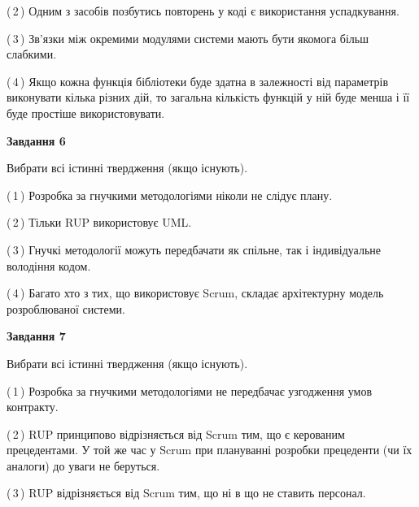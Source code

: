 \documentclass[10pt, ukrainian]{article}
\begin{document}
{\begin {large}
(\,2\,) Одним з засобів позбутись повторень у коді є використання успадкування. %



(\,3\,) Зв'язки між окремими модулями системи мають бути якомога більш слабкими. %



(\,4\,) Якщо кожна функція бібліотеки буде здатна в залежності від параметрів виконувати кілька різних дій, то загальна кількість функцій у ній буде менша і її буде простіше використовувати. %

\newpage

{\begin {center}\textbf{Завдання 6}\end {center}}\par
Вибрати всі істинні твердження (якщо існують).\par
\vspace{2mm}



(\,1\,) Розробка за гнучкими методологіями ніколи не слідує плану. %



(\,2\,) Тільки RUP використовує UML.%



(\,3\,) Гнучкі методології можуть передбачати як спільне, так і індивідуальне володіння кодом. %



(\,4\,) Багато хто з тих, що використовує Scrum, складає архітектурну модель розроблюваної системи. %


{\begin {center}\textbf{Завдання 7}\end {center}}\par
Вибрати всі істинні твердження (якщо існують).\par
\vspace{2mm}



(\,1\,) Розробка за гнучкими методологіями не передбачає узгодження умов контракту. %



(\,2\,) RUP принципово відрізняється від Scrum тим, що є керованим прецедентами. У той же час у Scrum при плануванні розробки прецеденти (чи їх аналоги) до уваги не беруться. %



(\,3\,) RUP відрізняється від Scrum тим, що ні в що не ставить персонал.%




\end{large}}
\end{document}
